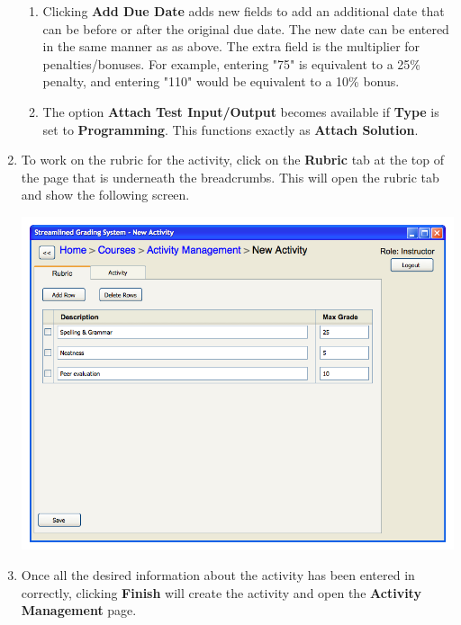\documentclass{article}
\begin{document}
\begin{enumerate}
\begin{center}
  \end{center}
  \begin{enumerate}
  \item Clicking \textbf{Add Due Date} adds new fields to add an additional
    date that can be before or after the original due date. The new date can
    be entered in the same manner as as above. The extra field is the multiplier
    for penalties/bonuses. For example, entering "75" is equivalent to a 25\%
    penalty, and entering "110" would be equivalent to a 10\% bonus.
  \item The option \textbf{Attach Test Input/Output} becomes available if \textbf{Type} 
  is set to \textbf{Programming}. This functions exactly as \textbf{Attach Solution}.
 \end{enumerate}
 \item To work on the rubric for the activity, click on the \textbf{Rubric} tab at the 
 top of the page that is underneath the breadcrumbs. This will open the rubric tab and 
 show the following screen.
 \begin{center} 
 

\includegraphics[scale=0.55]{../images/UIMockups/pngs/newActivityRubric}
 \end{center}
 \item Once all the desired information about the activity has been entered
   in correctly, clicking \textbf{Finish} will create the activity and open
   the \textbf{Activity Management} page.
\end{enumerate}
\end{document}
